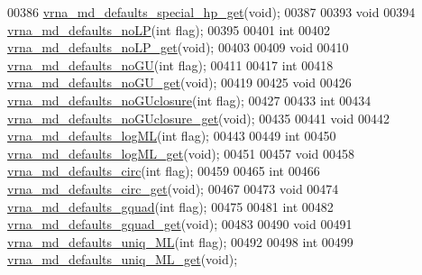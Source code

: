\begin{DoxyCode}
00386 \hyperlink{group__model__details_ga1d68a6efdaa1253cc63fd9cd06452559}{vrna\_md\_defaults\_special\_hp\_get}(\textcolor{keywordtype}{void});
00387 
00393 \textcolor{keywordtype}{void}
00394 \hyperlink{group__model__details_ga2f88ffc393ac9d7987849c965fd29ea8}{vrna\_md\_defaults\_noLP}(\textcolor{keywordtype}{int} flag);
00395 
00401 \textcolor{keywordtype}{int}
00402 \hyperlink{group__model__details_ga934344888fbacaed538bbbfe910f2aa6}{vrna\_md\_defaults\_noLP\_get}(\textcolor{keywordtype}{void});
00403 
00409 \textcolor{keywordtype}{void}
00410 \hyperlink{group__model__details_ga98218f85c7a957a1d1ddf4627fdf5a39}{vrna\_md\_defaults\_noGU}(\textcolor{keywordtype}{int} flag);
00411 
00417 \textcolor{keywordtype}{int}
00418 \hyperlink{group__model__details_ga5faa7d4e536d7fe36ec25428c0cf2563}{vrna\_md\_defaults\_noGU\_get}(\textcolor{keywordtype}{void});
00419 
00425 \textcolor{keywordtype}{void}
00426 \hyperlink{group__model__details_gade5b9951d71ca2fb357a4e6c0c18ccd1}{vrna\_md\_defaults\_noGUclosure}(\textcolor{keywordtype}{int} flag);
00427 
00433 \textcolor{keywordtype}{int}
00434 \hyperlink{group__model__details_ga4f7fdad083243a5348d63320ddaa70f3}{vrna\_md\_defaults\_noGUclosure\_get}(\textcolor{keywordtype}{void});
00435 
00441 \textcolor{keywordtype}{void}
00442 \hyperlink{group__model__details_ga3de50a73455d88c3957386933b8e1f90}{vrna\_md\_defaults\_logML}(\textcolor{keywordtype}{int} flag);
00443 
00449 \textcolor{keywordtype}{int}
00450 \hyperlink{group__model__details_ga93f04e070d529c5d0bb87c9681f6ad29}{vrna\_md\_defaults\_logML\_get}(\textcolor{keywordtype}{void});
00451 
00457 \textcolor{keywordtype}{void}
00458 \hyperlink{group__model__details_ga4e1deb3e91a8a99e5c6dd905a5eb0186}{vrna\_md\_defaults\_circ}(\textcolor{keywordtype}{int} flag);
00459 
00465 \textcolor{keywordtype}{int}
00466 \hyperlink{group__model__details_gad3a7e58de344ad93a08925f58f94f6fb}{vrna\_md\_defaults\_circ\_get}(\textcolor{keywordtype}{void});
00467 
00473 \textcolor{keywordtype}{void}
00474 \hyperlink{group__model__details_ga0685ca2aeb39af76f2421fc308163dce}{vrna\_md\_defaults\_gquad}(\textcolor{keywordtype}{int} flag);
00475 
00481 \textcolor{keywordtype}{int}
00482 \hyperlink{group__model__details_gae645b8612f879eb38b45244fa9eddb9e}{vrna\_md\_defaults\_gquad\_get}(\textcolor{keywordtype}{void});
00483 
00490 \textcolor{keywordtype}{void}
00491 \hyperlink{group__model__details_ga59b944f61c5d2babec2d4c48c820de67}{vrna\_md\_defaults\_uniq\_ML}(\textcolor{keywordtype}{int} flag);
00492 
00498 \textcolor{keywordtype}{int}
00499 \hyperlink{group__model__details_gab48e70fd024bf838404bcbcca0c874a0}{vrna\_md\_defaults\_uniq\_ML\_get}(\textcolor{keywordtype}{void});

\end{DoxyCode}
